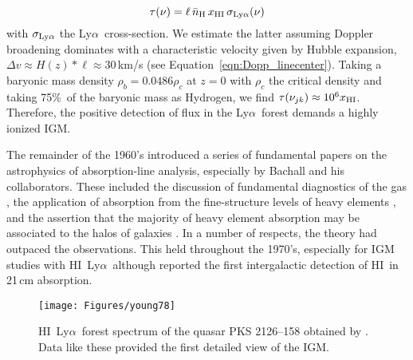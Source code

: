 \documentclass[graybox]{svmult}
\newcommand{\HI}{H{\sc I}}
\def\lya{Ly$\alpha$}
\def\mlya{{\rm Ly}\alpha}
\begin{document}
\begin{equation}
\tau(\nu) = \ell \, \bar n_{\rm H} \, x_{\rm HI} \, \sigma_{\mlya}(\nu)
\end{equation}
with $\sigma_{\mlya}$ the \lya\ cross-section.
We estimate the latter assuming Doppler broadening dominates
with a characteristic velocity given by Hubble expansion,
$\Delta v \approx H(z) * \ell \approx 30$\,km/s 
(see Equation~\ref{eqn:Dopp_linecenter}).
Taking a baryonic mass density $\rho_b = 0.0486 \rho_c$
at $z=0$ with $\rho_c$ the critical density and
taking 75\%\ of the baryonic mass as Hydrogen,
we find $\tau(\nu_{jk}) \approx 10^6 x_{\rm HI}$.
Therefore, the positive detection of flux in the 
\lya\ forest demands a highly ionized IGM.

The remainder of the 1960's introduced a series of 
fundamental papers on the astrophysics of absorption-line
analysis, especially by Bachall and his collaborators.
These included the discussion of fundamental diagnostics
of the gas \cite{bahcall67}, 
the application of absorption from the fine-structure 
levels of heavy elements \cite{bw68}, and the
assertion that the majority of heavy element absorption
may be associated to the halos of galaxies
\cite{bp69,bs69}.
In a number of respects, the theory had outpaced the
observations.
This held throughout the 1970's, especially for IGM
studies with \HI\ \lya\ although \cite{brown73}
reported the first intergalactic detection of 
\HI\ in 21\,cm absorption.

%
\begin{figure}[b]
\sidecaption
\texttt{[image: Figures/young78]}
%
%
\caption{\HI\ \lya\ forest spectrum of the quasar PKS 2126--158
obtained by \cite{young79}.  Data like these provided the first
detailed view of the IGM.
}
\label{fig:young}       %
\end{figure}
\end{document}
